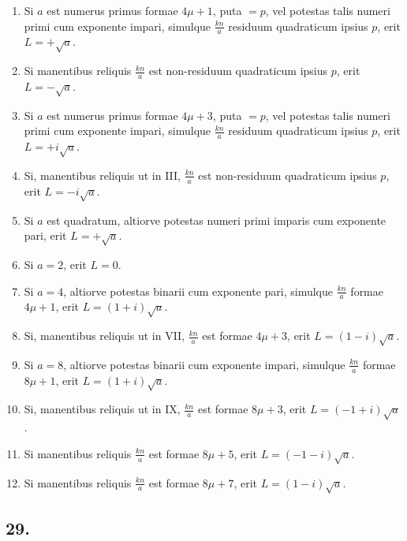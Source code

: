 \documentclass[12pt]{article}
\begin{document}
\begin{enumerate}[label=\Roman*.,leftmargin=2.5em]
\item Si $a$ est numerus primus formae $4\mu+1$, puta $=p$, vel potestas talis numeri primi cum exponente impari, simulque $\frac{kn}{a}$ residuum quadraticum ipsius $p$, erit $L=+\sqrt a$.
\item Si manentibus reliquis $\frac{kn}{a}$ est non-residuum quadraticum ipsius $p$, erit $L=-\sqrt a$.
\item Si $a$ est numerus primus formae $4\mu+3$, puta $=p$, vel potestas talis numeri primi cum exponente impari, simulque $\frac{kn}{a}$ residuum quadraticum ipsius $p$, erit $L=+i\sqrt a$.
\item Si, manentibus reliquis ut in III, $\frac{kn}{a}$ est non-residuum quadraticum ipsius $p$, erit $L=-i\sqrt a$.
\item Si $a$ est quadratum, altiorve potestas numeri primi imparis cum exponente pari, erit $L=+\sqrt a$.
\item Si $a=2$, erit $L=0$.
\item Si $a=4$, altiorve potestas binarii cum exponente pari, simulque $\frac{kn}{a}$ formae $4\mu+1$, erit $L=(1+i)\sqrt a$.
\item Si, manentibus reliquis ut in VII, $\frac{kn}{a}$ est formae $4\mu+3$, erit $L=(1-i)\sqrt a$.
\item Si $a=8$, altiorve potestas binarii cum exponente impari, simulque $\frac{kn}{a}$ formae $8\mu+1$, erit $L=(1+i)\sqrt a$.
\item Si, manentibus reliquis ut in IX, $\frac{kn}{a}$ est formae $8\mu+3$, erit $L=(-1+i)\sqrt a$.
\item Si manentibus reliquis $\frac{kn}{a}$ est formae $8\mu+5$, erit $L=(-1-i)\sqrt a$.
\item Si manentibus reliquis $\frac{kn}{a}$ est formae $8\mu+7$, erit $L=(1-i)\sqrt a$.
\end{enumerate}

\subsection*{29.}
\end{document}
